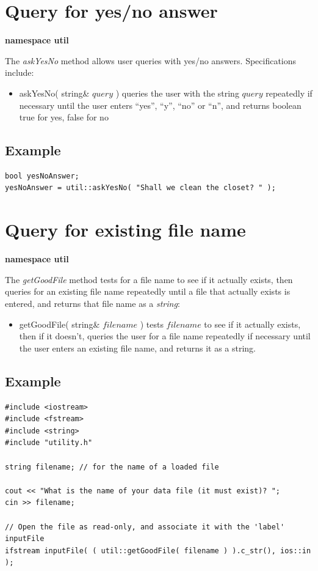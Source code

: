 \documentclass{report}
\begin{document}
\section{Query for yes/no answer}

{\bf namespace util}

The {\em askYesNo} method allows user queries with yes/no answers.
Specifications include:

\begin{itemize}
\item askYesNo( string\& $query$ ) queries the user with the string
      $query$ repeatedly if necessary until the user enters ``yes'',
      ``y'', ``no'' or ``n'', and returns boolean true for yes, false
      for no
\end{itemize}

\subsection{Example}
\begin{verbatim}
bool yesNoAnswer;
yesNoAnswer = util::askYesNo( "Shall we clean the closet? " );
\end{verbatim}

\section{Query for existing file name}

{\bf namespace util}

The {\em getGoodFile} method tests for a file name to see if it
actually exists, then queries for an existing file name repeatedly
until a file that actually exists is entered, and returns that file
name as a {\em string}:

\begin{itemize}
\item getGoodFile( string\& $filename$ ) tests $filename$ to see if it
      actually exists, then if it doesn't, queries the user for a file
      name repeatedly if necessary until the user enters an existing
      file name, and returns it as a string.
\end{itemize}

\subsection{Example}
\begin{verbatim}
#include <iostream>
#include <fstream>
#include <string>
#include "utility.h"

string filename; // for the name of a loaded file

cout << "What is the name of your data file (it must exist)? ";
cin >> filename;

// Open the file as read-only, and associate it with the 'label'
inputFile
ifstream inputFile( ( util::getGoodFile( filename ) ).c_str(), ios::in
);
\end{verbatim}
\end{document}
